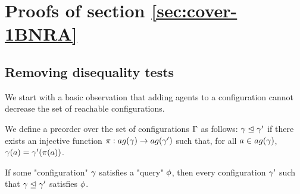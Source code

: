 
\section{Proofs of section \ref{sec:cover-1BNRA}}

\label{app:cover-one-reg}
\subsection{Removing disequality tests}
\label{sec:one-diseq-tests}

We start with a basic observation that adding agents to a configuration cannot decrease the set of reachable configurations.


\begin{definition}
	We define a preorder over the set of configurations $\Gamma$ as follows: $\gamma \trianglelefteq \gamma'$ if there exists an injective function $\pi: \agentsof{\config} \rightarrow \agentsof{\config'}$ such that, for all $a \in \agentsof{\config}$, $\gamma(a) = \gamma'(\pi(a))$. 
\end{definition}

\begin{remark}
			\label{rem:bigger_config_query}
			If some "configuration" $\gamma$ satisfies a "query" $\phi$, then every configuration $\gamma'$ such that $\gamma \trianglelefteq \gamma'$ satisfies $\phi$. 
\end{remark}

\lemRemoveDiseq*

